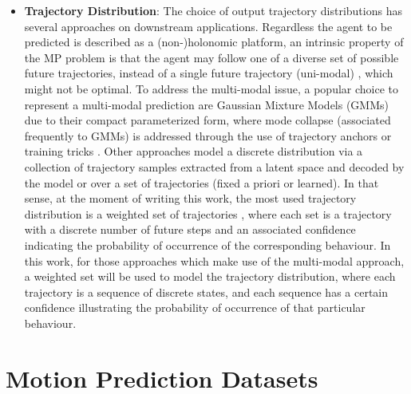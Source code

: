 \begin{itemize}
	\item \textbf{Trajectory Distribution}: The choice of output trajectory distributions has several approaches on downstream applications. Regardless the agent to be predicted is described as a (non-)holonomic \cite{triggs1993motion} platform, an intrinsic property of the \ac{MP} problem is that the agent may follow one of a diverse set of possible future trajectories, instead of a single future trajectory (uni-modal) \cite{gao2020vectornet}, which might not be optimal. To address the multi-modal issue, a popular choice to represent a multi-modal prediction are Gaussian Mixture Models (GMMs) due to their compact parameterized form, where mode collapse (associated frequently to GMMs) is addressed through the use of trajectory anchors \cite{chai2019multipath} or training  tricks \cite{cui2019multimodal}. Other approaches model a discrete distribution via a collection of trajectory samples extracted from a latent space and decoded by the model \cite{rhinehart2018r2p2} or over a set of trajectories (fixed a priori or learned). In that sense, at the moment of writing this work, the most used trajectory distribution is a weighted set of trajectories \cite{liang2020learning, zhao2021tnt, schmidt2022crat}, where each set is a trajectory with a discrete number of future steps and an associated confidence indicating the probability of occurrence of the corresponding behaviour. In this work, for those approaches which make use of the multi-modal approach, a weighted set will be used to model the trajectory distribution, where each trajectory is a sequence of discrete states, and each sequence has a certain confidence illustrating the probability of occurrence of that particular behaviour.
	
\end{itemize}

\section{Motion Prediction Datasets}
\label{sec:2_motion_prediction_datasets}

